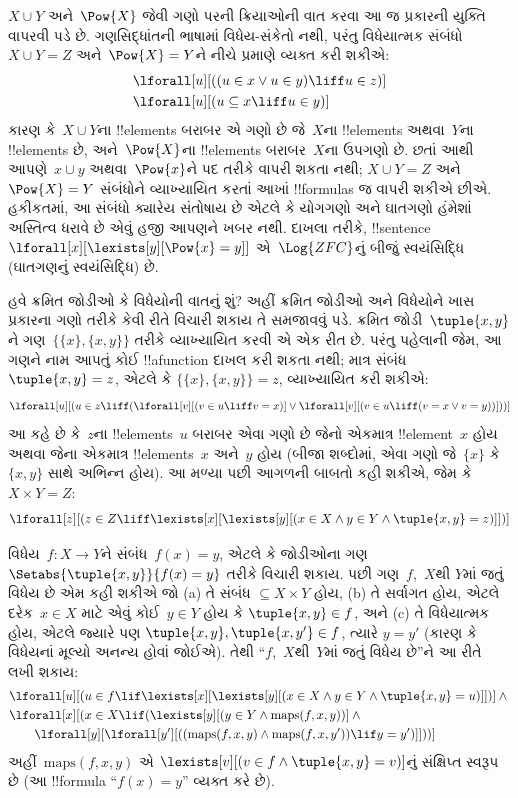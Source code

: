 \documentclass[../../../include/open-logic-section]{subfiles}
\begin{document}
$X\cup Y$ અને~$\Pow{X}$ જેવી ગણો પરની ક્રિયાઓની વાત કરવા આ જ પ્રકારની
યુક્તિ વાપરવી પડે છે. ગણસિદ્ધાંતની ભાષામાં વિધેય-સંકેતો નથી, પરંતુ
વિધેયાત્મક સંબંધો~$X\cup Y=Z$ અને~$\Pow{X}=Y$ને નીચે પ્રમાણે વ્યક્ત
કરી શકીએ:
\begin{align*}
& \lforall[u][((u \in x \lor u \in y) \liff u \in z)]\\
& \lforall[u][(u \subseteq x \liff u \in y )]
\end{align*}
કારણ કે~$X\cup Y$ના !!{element}s બરાબર એ ગણો છે જે~$X$ના
!!{element}s અથવા~$Y$ના !!{element}s છે, અને~$\Pow{X}$ના !!{element}s
બરાબર~$X$ના ઉપગણો છે.
છતાં આથી આપણે~$x\cup y$ અથવા~$\Pow{x}$ને પદ તરીકે વાપરી શકતા નથી;
$X\cup Y=Z$ અને~$\Pow{X}=Y$ સંબંધોને વ્યાખ્યાયિત કરતાં આખાં
!!{formula}s જ વાપરી શકીએ છીએ. હકીકતમાં, આ સંબંધો ક્યારેય સંતોષાય છે
એટલે કે યોગગણો અને ઘાતગણો હંમેશાં અસ્તિત્વ ધરાવે છે એવું હજી આપણને
ખબર નથી. દાખલા તરીકે, !!{sentence}
$\lforall[x][\lexists[y][\Pow{x}=y]]$ એ~$\Log{ZFC}$નું બીજું
સ્વયંસિદ્ધિ (ઘાતગણનું સ્વયંસિદ્ધિ) છે.

હવે ક્રમિત જોડીઓ કે વિધેયોની વાતનું શું? અહીં ક્રમિત જોડીઓ અને
વિધેયોને ખાસ પ્રકારના ગણો તરીકે કેવી રીતે વિચારી શકાય તે સમજાવવું પડે.
ક્રમિત જોડી~$\tuple{x,y}$ને ગણ~$\{\{x\},\{x,y\}\}$ તરીકે વ્યાખ્યાયિત
કરવી એ એક રીત છે. પરંતુ પહેલાની જેમ, આ ગણને નામ આપતું કોઈ
!!a{function} દાખલ કરી શકતા નથી; માત્ર સંબંધ~$\tuple{x,y}=z$, એટલે કે
$\{\{x\},\{x,y\}\}=z$, વ્યાખ્યાયિત કરી શકીએ:
\[
\lforall[u][(u \in z \liff (\lforall[v][(v \in u \liff v = x)] \lor
  \lforall[v][(v \in u \liff (v = x \lor v = y))]))]
\]
આ કહે છે કે~$z$ના !!{element}s~$u$ બરાબર એવા ગણો છે જેનો એકમાત્ર
!!{element}~$x$ હોય અથવા જેના એકમાત્ર !!{element}s~$x$ અને~$y$ હોય
(બીજા શબ્દોમાં, એવા ગણો જે~$\{x\}$ કે~$\{x,y\}$ સાથે અભિન્ન હોય).
આ મળ્યા પછી આગળની બાબતો કહી શકીએ, જેમ કે~$X\times Y=Z$:
\[
\lforall[z][(z \in Z \liff \lexists[x][\lexists[y][(x \in
        X \land y \in Y \land \tuple{x, y} = z)]])]
\]

વિધેય~$f\colon X\to Y$ને સંબંધ~$f(x)=y$, એટલે કે જોડીઓના ગણ
$\Setabs{\tuple{x,y}}{f(x)=y}$ તરીકે વિચારી શકાય. પછી ગણ~$f$,~$X$થી
$Y$માં જતું વિધેય છે એમ કહી શકીએ જો (a) તે સંબંધ
$\subseteq X\times Y$ હોય, (b) તે સર્વાગત હોય, એટલે દરેક~$x\in X$
માટે એવું કોઈ~$y\in Y$ હોય કે $\tuple{x,y}\in f$, અને (c) તે
વિધેયાત્મક હોય, એટલે જ્યારે પણ
$\tuple{x,y},\tuple{x,y'}\in f$, ત્યારે $y=y'$ (કારણ કે વિધેયનાં
મૂલ્યો અનન્ય હોવાં જોઈએ). તેથી ``$f$,~$X$થી~$Y$માં જતું વિધેય છે''ને
આ રીતે લખી શકાય:
\begin{align*}
& \lforall[u][(u \in f \lif
   \lexists[x][\lexists[y][(x \in X \land y \in
      Y \land \tuple{x, y} = u)]])] \land {}\\
& \lforall[x][(x \in X \lif
   (\lexists[y][(y \in Y \land \mathrm{maps}(f, x, y))] \land {}\\
&\qquad \lforall[y][\lforall[y'][((\mathrm{maps}(f, x, y) \land
    \mathrm{maps}(f, x, y')) \lif y = y')]]))]
\end{align*}
અહીં~$\mathrm{maps}(f,x,y)$ એ
$\lexists[v][(v\in f\land\tuple{x,y}=v)]$નું સંક્ષિપ્ત સ્વરૂપ છે (આ
!!{formula} ``$f(x)=y$'' વ્યક્ત કરે છે).
\end{document}
